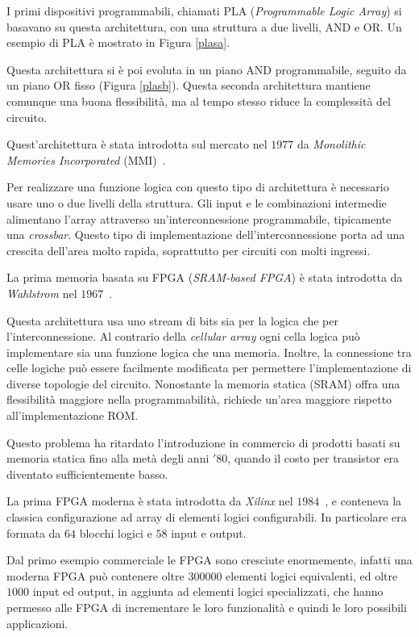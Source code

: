 I primi dispositivi programmabili, chiamati PLA (\textit{Programmable Logic Array}) si basavano su questa architettura, con una struttura a due livelli, AND e OR. Un esempio di PLA è mostrato in Figura \ref{plasa}.

Questa architettura si è poi evoluta in un piano AND programmabile, seguito da un piano OR fisso (Figura \ref{plasb}). Questa seconda architettura mantiene comunque una buona flessibilità, ma al tempo stesso riduce la complessità del circuito.

Quest'architettura è stata introdotta sul mercato nel $1977$ da \textit{Monolithic Memories Incorporated} (MMI)~\cite{birkner1978programmable}.

Per realizzare una funzione logica con questo tipo di architettura è necessario usare uno o due livelli della struttura. Gli input e le combinazioni intermedie alimentano l'array attraverso un'interconnessione programmabile, tipicamente una \textit{crossbar}. Questo tipo di implementazione dell'interconnessione porta ad una crescita dell'area molto rapida, soprattutto per circuiti con molti ingressi.

La prima memoria basata su FPGA (\textit{SRAM-based FPGA}) è stata introdotta da \textit{Wahlstrom} nel $1967$~\cite{wahl}. 

Questa architettura usa uno stream di bits sia per la logica che per l'interconnessione. Al contrario della \textit{cellular array} ogni cella logica può implementare sia una funzione logica che una memoria. Inoltre, la connessione tra celle logiche può essere facilmente modificata per permettere l'implementazione di diverse topologie del circuito. Nonostante la memoria statica (SRAM) offra una flessibilità maggiore nella programmabilità, richiede un'area maggiore rispetto all'implementazione ROM.

Questo problema ha ritardato l'introduzione in commercio di prodotti basati su memoria statica fino alla metà degli anni $'80$, quando il costo per transistor era diventato sufficientemente basso.

La prima FPGA moderna è stata introdotta da \textit{Xilinx} nel $1984$~\cite{reconfgate}, e conteneva la classica configurazione ad array di elementi logici configurabili. In particolare era formata da $64$ blocchi logici e $58$ input e output. 

Dal primo esempio commerciale le FPGA sono cresciute enormemente, infatti una moderna FPGA può contenere oltre $300000$ elementi logici equivalenti, ed oltre $1000$ input ed output, in aggiunta ad elementi logici specializzati, che hanno permesso alle FPGA di incrementare le loro funzionalità e quindi le loro possibili applicazioni.

